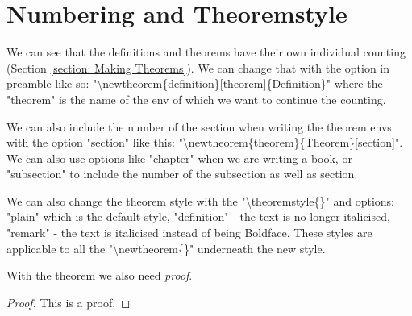 \documentclass[12pt,titlepage]{article}
\begin{document}
\section{Numbering and Theoremstyle}
We can see that the definitions and theorems have their own individual counting (Section \ref{section: Making Theorems}). We can change that with the option in preamble like so: "\textbackslash newtheorem\{definition\}[theorem]\{Definition\}" where the "theorem" is the name of the env of which we want to continue the counting.

We can also include the number of the section when writing the theorem envs with the option "section" like this: "\textbackslash newtheorem\{theorem\}\{Theorem\}[section]". We can also use options like "chapter" when we are writing a book, or "subsection" to include the number of the subsection as well as section.

We can also change the theorem style with the "\textbackslash theoremstyle\{\}" and options: "plain" which is the default style, "definition" - the text is no longer italicised, "remark" - the text is italicised instead of being Boldface. These styles are applicable to all the "\textbackslash newtheorem\{\}" underneath the new style.

\vspace{0.5cm}
With the theorem we also need \textit{proof}.
\begin{proof}
    This is a proof.
\end{proof}
\end{document}
